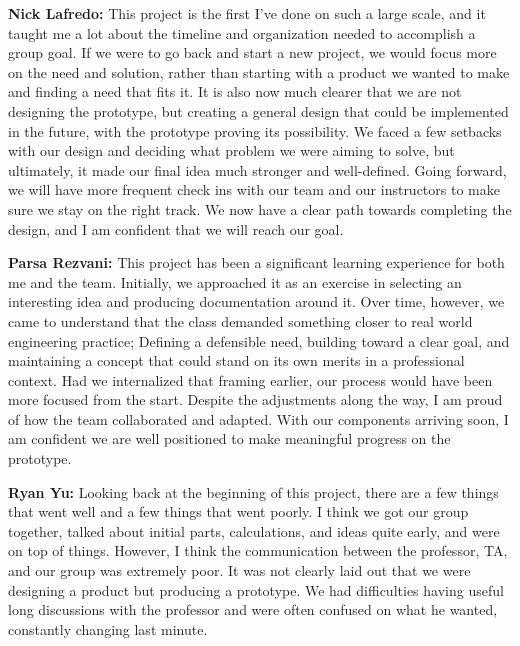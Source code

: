 \documentclass[journal, onecolumn]{IEEEtran}
\begin{document}
\vspace{1em}

\textbf{Nick Lafredo:} This project is the first I've done on such a large scale, and it taught me a lot about the timeline and organization needed to accomplish a group goal. If we were to go back and start a new project, we would focus more on the need and solution, rather than starting with a product we wanted to make and finding a need that fits it. It is also now much clearer that we are not designing the prototype, but creating a general design that could be implemented in the future, with the prototype proving its possibility. We faced a few setbacks with our design and deciding what problem we were aiming to solve, but ultimately, it made our final idea much stronger and well-defined. Going forward, we will have more frequent check ins with our team and our instructors to make sure we stay on the right track. We now have a clear path towards completing the design, and I am confident that we will reach our goal.

\vspace{1em}

\textbf{Parsa Rezvani:} This project has been a significant learning experience for both me and the team. Initially, we approached it as an exercise in selecting an interesting idea and producing documentation around it. Over time, however, we came to understand that the class demanded something closer to real world engineering practice; Defining a defensible need, building toward a clear goal, and maintaining a concept that could stand on its own merits in a professional context. Had we internalized that framing earlier, our process would have been more focused from the start. Despite the adjustments along the way, I am proud of how the team collaborated and adapted. With our components arriving soon, I am confident we are well positioned to make meaningful progress on the prototype.

\vspace{1em}

\textbf{Ryan Yu:} Looking back at the beginning of this project, there are a few things that went well and a few things that went poorly. I think we got our group together, talked about initial parts, calculations, and ideas quite early, and were on top of things. However, I think the communication between the professor, TA, and our group was extremely poor. It was not clearly laid out that we were designing a product but producing a prototype. We had difficulties having useful long discussions with the professor and were often confused on what he wanted, constantly changing last minute.
\end{document}
